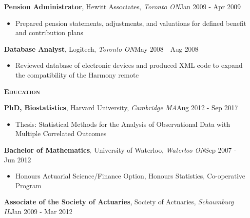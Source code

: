 \documentclass[10pt,english]{article}
\begin{document}
\textbf{Pension Administrator}, Hewitt Associates, \textit{Toronto
ON}\hfill{}Jan 2009 - Apr 2009
\begin{itemize}
\item Prepared pension statements, adjustments, and valuations for defined
benefit and contribution plans
\end{itemize}
\vspace{2.5mm}

\textbf{Database Analyst}, Logitech, \textit{Toronto ON}\hfill{}May
2008 - Aug 2008
\begin{itemize}
\item Reviewed database of electronic devices and produced XML code to expand
the compatibility of the Harmony remote
\end{itemize}
\vspace{3mm}
\begin{mdframed}[backgroundcolor=bgcolor,linewidth=3pt]

\textbf{\textsc{Education}}

\end{mdframed}

\textbf{PhD, Biostatistics}, Harvard University, \textit{Cambridge
MA}\hfill{}Aug 2012 - Sep 2017
\begin{itemize}
\item Thesis: Statistical Methods for the Analysis of Observational Data
with Multiple Correlated Outcomes
\end{itemize}
\vspace{2.5mm}

\textbf{Bachelor of Mathematics}, University of Waterloo, \textit{Waterloo
ON}\hfill{}Sep 2007 - Jun 2012
\begin{itemize}
\item Honours Actuarial Science/Finance Option, Honours Statistics, Co-operative
Program
\end{itemize}
\vspace{2.5mm}

\textbf{Associate of the Society of Actuaries}, Society of Actuaries,
\textit{Schaumburg IL}\hfill{}Jan 2009 - Mar 2012
\end{document}
